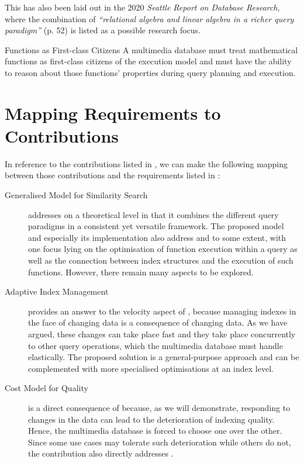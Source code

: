 This has also been laid out in the 2020 \emph{Seattle Report on Database Research}, where the combination of \emph{``relational algebra and linear algebra in a richer query paradigm''} \cite{Abadi:2020Seattle} (p. 52) is listed as a possible research focus.

\begin{requirement}[label=requirement:functions]{Functions as First-class Citizens}{}
    A multimedia database must treat mathematical functions as first-class citizens of the execution model and must have the ability to reason about those functions' properties during query planning and execution.
\end{requirement}

\section{Mapping Requirements to Contributions}

In reference to the contributions listed in , we can make the following mapping between those contributions and the requirements listed in :

\begin{description}
    \item[Generalised Model for Similarity Search] addresses  on a theoretical level in that it combines the different query paradigms in a consistent yet versatile framework. The proposed model and especially its implementation also address  and  to some extent, with one focus lying on the optimisation of function execution within a query as well as the connection between index structures and the execution of such functions. However, there remain many aspects to be explored.
    \item[Adaptive Index Management] provides an answer to the velocity aspect of , because managing indexes in the face of changing data is a consequence of changing data. As we have argued, these changes can take place fast and they take place concurrently to other query operations, which the multimedia database must handle elastically. The proposed solution is a general-purpose approach and can be complemented with more specialised optimisations at an index level.
    \item[Cost Model for Quality] is a direct consequence of  because, as we will demonstrate, responding to changes in the data can lead to the deterioration of indexing quality. Hence, the multimedia database is forced to choose one over the other. Since some use cases may tolerate such deterioration while others do not, the contribution also directly addresses .
\end{description}